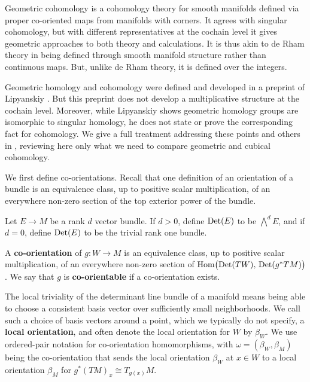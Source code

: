 Geometric cohomology is a cohomology theory for smooth manifolds defined via proper co-oriented maps from manifolds with corners.
It agrees with singular cohomology, but with different representatives at the cochain level it gives geometric approaches to both theory and calculations.
It is thus akin to de Rham theory in being defined through smooth manifold structure rather than continuous maps.
But, unlike de Rham theory, it is defined over the integers.

Geometric homology and cohomology were defined and developed in a preprint of Lipyanskiy \cite{Lipy14}.
But this preprint does not develop a multiplicative structure at the cochain level.
Moreover, while Lipyanskiy shows geometric homology groups are isomorphic to singular homology, he does not state or prove the corresponding fact for cohomology.
We give a full treatment addressing these points and others in \cite{medina2022foundations}, reviewing here only what we need to compare geometric and cubical cohomology.

We first define co-orientations.
Recall that one definition of an orientation of a bundle is an equivalence class, up to positive scalar multiplication, of an everywhere non-zero section of the top exterior power of the bundle.

\begin{definition}\label{D: co-orientations}
	Let $E \to M$ be a rank $d$ vector bundle.
	If $d > 0$, define ${\rm Det}(E)$ to be $\bigwedge^d E$, and if $d = 0$, define ${\rm Det}(E)$ to be the trivial rank one bundle.

	A \textbf{co-orientation} of $g \colon W \to M$ is an equivalence class, up to positive scalar multiplication, of an everywhere non-zero section of $\textup{Hom} \big( {\rm Det}(TW),\, {\rm Det}(g^*TM) \big)$.
	We say that $g$ is \textbf{co-orientable} if a co-orientation exists.
\end{definition}

The local triviality of the determinant line bundle of a manifold means being able to choose a consistent basis vector over sufficiently small neighborhoods.
We call such a choice of basis vectors around a point, which we typically do not specify, a \textbf{local orientation}, and often denote the local orientation for $W$ by $\beta_W$.
We use ordered-pair notation for co-orientation homomorphisms, with $\omega = (\beta_W, \beta_M)$ being the co-orientation that sends the local orientation $\beta_W$ at $x\in W$ to a local orientation $\beta_M$ for $g^*(TM)_x\cong T_{g(x)}M$.

